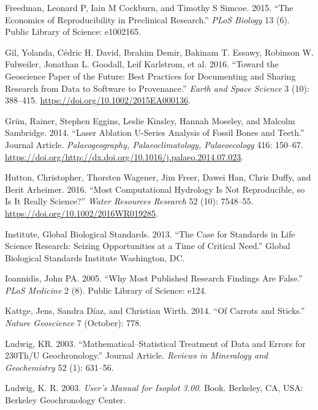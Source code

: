 \documentclass[]{elsarticle} %
\begin{document}
\leavevmode\hypertarget{ref-freedman2015economics}{}%
Freedman, Leonard P, Iain M Cockburn, and Timothy S Simcoe. 2015. ``The Economics of Reproducibility in Preclinical Research.'' \emph{PLoS Biology} 13 (6). Public Library of Science: e1002165.

\leavevmode\hypertarget{ref-Gil_et_al_2016}{}%
Gil, Yolanda, Cédric H. David, Ibrahim Demir, Bakinam T. Essawy, Robinson W. Fulweiler, Jonathan L. Goodall, Leif Karlstrom, et al. 2016. ``Toward the Geoscience Paper of the Future: Best Practices for Documenting and Sharing Research from Data to Software to Provenance.'' \emph{Earth and Space Science} 3 (10): 388--415. \url{https://doi.org/10.1002/2015EA000136}.

\leavevmode\hypertarget{ref-Gruen2014}{}%
Grün, Rainer, Stephen Eggins, Leslie Kinsley, Hannah Moseley, and Malcolm Sambridge. 2014. ``Laser Ablation U-Series Analysis of Fossil Bones and Teeth.'' Journal Article. \emph{Palaeogeography, Palaeoclimatology, Palaeoecology} 416: 150--67. \url{https://doi.org/http://dx.doi.org/10.1016/j.palaeo.2014.07.023}.

\leavevmode\hypertarget{ref-Hutton_et_al_2016}{}%
Hutton, Christopher, Thorsten Wagener, Jim Freer, Dawei Han, Chris Duffy, and Berit Arheimer. 2016. ``Most Computational Hydrology Is Not Reproducible, so Is It Really Science?'' \emph{Water Resources Research} 52 (10): 7548--55. \url{https://doi.org/10.1002/2016WR019285}.

\leavevmode\hypertarget{ref-global2013case}{}%
Institute, Global Biological Standards. 2013. ``The Case for Standards in Life Science Research: Seizing Opportunities at a Time of Critical Need.'' Global Biological Standards Institute Washington, DC.

\leavevmode\hypertarget{ref-ioannidis2005most}{}%
Ioannidis, John PA. 2005. ``Why Most Published Research Findings Are False.'' \emph{PLoS Medicine} 2 (8). Public Library of Science: e124.

\leavevmode\hypertarget{ref-Kattge_Duxedaz_Wirth_2014}{}%
Kattge, Jens, Sandra Díaz, and Christian Wirth. 2014. ``Of Carrots and Sticks.'' \emph{Nature Geoscience} 7 (October): 778.

\leavevmode\hypertarget{ref-RN4370}{}%
Ludwig, KR. 2003. ``Mathematical--Statistical Treatment of Data and Errors for 230Th/U Geochronology.'' Journal Article. \emph{Reviews in Mineralogy and Geochemistry} 52 (1): 631--56.

\leavevmode\hypertarget{ref-RN2163}{}%
Ludwig, K. R. 2003. \emph{User's Manual for Isoplot 3.00}. Book. Berkeley, CA, USA: Berkeley Geochronology Center.
\end{document}
